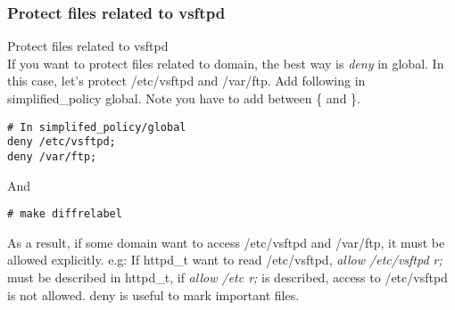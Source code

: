 \subsubsection{Protect files related to vsftpd}
 Protect files related to vsftpd\\
       If you want to protect files related to domain, the best way is {\it
       deny } in global. In this case, let's protect /etc/vsftpd and
       /var/ftp.  Add following in simplified\_policy global. Note you
       have to add between \{ and \}.
       \begin{verbatim}
# In simplifed_policy/global
deny /etc/vsftpd;
deny /var/ftp;
       \end{verbatim}
       And 
\begin{verbatim}
# make diffrelabel	
\end{verbatim}
       As a result, if some domain want to access /etc/vsftpd and
       /var/ftp, it must be allowed explicitly. e.g: If httpd\_t want to read
       /etc/vsftpd, {\it allow /etc/vsftpd r;} must be described in
       httpd\_t, if {\it allow /etc r;} is described, access to
       /etc/vsftpd is not allowed. deny is useful to mark important
       files.

